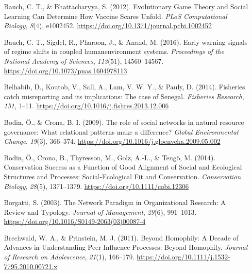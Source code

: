 \documentclass[
  12pt,
]{article}
\newlength{\cslhangindent}
\newlength{\cslentryspacingunit} %
\newenvironment{CSLReferences}[2] %
 {%
  \setlength{\parindent}{0pt}
  \ifodd #1
  \let\oldpar\par
  \def\par{\hangindent=\cslhangindent\oldpar}
  \fi
  \setlength{\parskip}{#2\cslentryspacingunit}
 }%
 {}
\begin{document}
\begin{CSLReferences}{1}{2}
\leavevmode{}%
Bauch, C. T., \& Bhattacharyya, S. (2012). Evolutionary {Game Theory} and {Social Learning Can Determine How Vaccine Scares Unfold}. \emph{PLoS Computational Biology}, \emph{8}(4), e1002452. \url{https://doi.org/10.1371/journal.pcbi.1002452}

\leavevmode{}%
Bauch, C. T., Sigdel, R., Pharaon, J., \& Anand, M. (2016). Early warning signals of regime shifts in coupled human\textendash environment systems. \emph{Proceedings of the National Academy of Sciences}, \emph{113}(51), 14560--14567. \url{https://doi.org/10.1073/pnas.1604978113}

\leavevmode{}%
Belhabib, D., Koutob, V., Sall, A., Lam, V. W. Y., \& Pauly, D. (2014). Fisheries catch misreporting and its implications: {The} case of {Senegal}. \emph{Fisheries Research}, \emph{151}, 1--11. \url{https://doi.org/10.1016/j.fishres.2013.12.006}

\leavevmode{}%
Bodin, Ö., \& Crona, B. I. (2009). The role of social networks in natural resource governance: {What} relational patterns make a difference? \emph{Global Environmental Change}, \emph{19}(3), 366--374. \url{https://doi.org/10.1016/j.gloenvcha.2009.05.002}

\leavevmode{}%
Bodin, Ö., Crona, B., Thyresson, M., Golz, A.-L., \& Tengö, M. (2014). Conservation {Success} as a {Function} of {Good Alignment} of {Social} and {Ecological Structures} and {Processes}: {Social-Ecological Fit} and {Conservation}. \emph{Conservation Biology}, \emph{28}(5), 1371--1379. \url{https://doi.org/10.1111/cobi.12306}

\leavevmode{}%
Borgatti, S. (2003). The {Network Paradigm} in {Organizational Research}: {A Review} and {Typology}. \emph{Journal of Management}, \emph{29}(6), 991--1013. \url{https://doi.org/10.1016/S0149-2063(03)00087-4}

\leavevmode{}%
Brechwald, W. A., \& Prinstein, M. J. (2011). Beyond {Homophily}: {A Decade} of {Advances} in {Understanding Peer Influence Processes}: {Beyond Homophily}. \emph{Journal of Research on Adolescence}, \emph{21}(1), 166--179. \url{https://doi.org/10.1111/j.1532-7795.2010.00721.x}


\end{CSLReferences}
\end{document}
